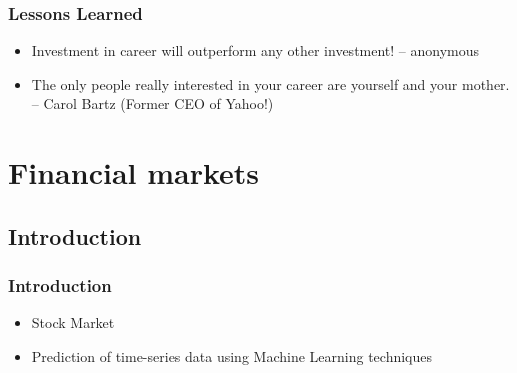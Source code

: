 \documentclass{beamer}
\begin{document}
\begin{frame}
  \frametitle{Lessons Learned}
  \begin{itemize}[<+->]
  \item Investment in career will outperform any other investment! -- anonymous
  \item The only people really interested in your career are yourself and your mother. -- Carol Bartz (Former CEO of Yahoo!)
  \end{itemize}
\end{frame}

\section{Financial markets}
\subsection{Introduction}
\begin{frame}
  \frametitle{Introduction}
  \begin{itemize}[<+->]
  \item Stock Market
  \item Prediction of time-series data using Machine Learning techniques
  \end{itemize}
\end{frame}
\end{document}
